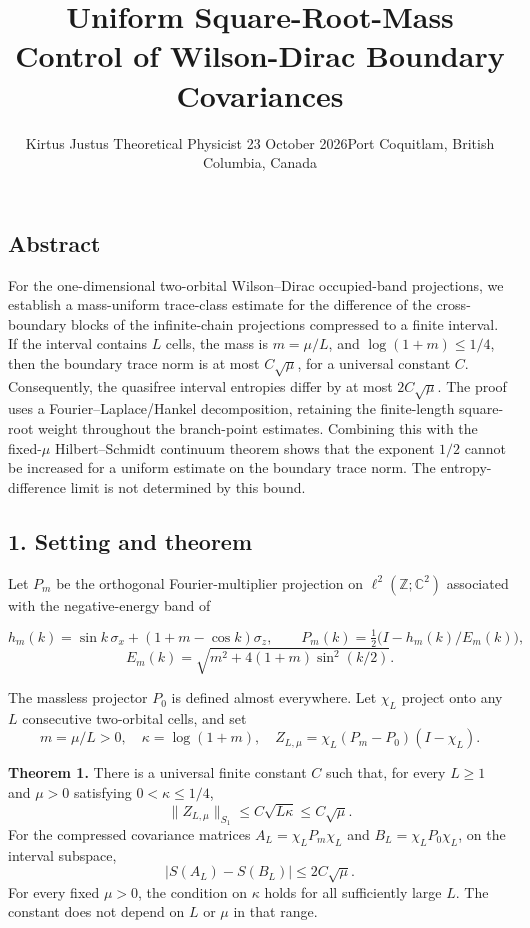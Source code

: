 \documentclass[
  10pt,
  a4paper,
]{article}
\title{Uniform Square-Root-Mass Control of Wilson-Dirac Boundary Covariances}
\author{Kirtus Justus \textbullet{} Theoretical Physicist \textbullet{} 23 October 2026\tabularnewline Port Coquitlam, British Columbia, Canada}
\date{}
\begin{document}
\maketitle

\subsection{Abstract}\label{abstract}

For the one-dimensional two-orbital Wilson--Dirac occupied-band projections, we establish a mass-uniform trace-class estimate for the difference of the cross-boundary blocks of the infinite-chain projections compressed to a finite interval. If the interval contains \(L\) cells, the mass is \(m=\mu/L\), and \(\log(1+m)\le 1/4\), then the boundary trace norm is at most \(C\sqrt{\mu}\), for a universal constant \(C\). Consequently, the quasifree interval entropies differ by at most \(2C\sqrt\mu\). The proof uses a Fourier--Laplace/Hankel decomposition, retaining the finite-length square-root weight throughout the branch-point estimates. Combining this with the fixed-\(\mu\) Hilbert--Schmidt continuum theorem shows that the exponent \(1/2\) cannot be increased for a uniform estimate on the boundary trace norm. The entropy-difference limit is not determined by this bound.

\subsection{1. Setting and theorem}\label{setting-and-theorem}

Let \(P_m\) be the orthogonal Fourier-multiplier projection on \(\ell^2(\mathbb Z;\mathbb C^2)\) associated with the negative-energy band of

\[
 h_m(k)=\sin k\,\sigma_x+(1+m-\cos k)\sigma_z,
 \qquad P_m(k)=\tfrac12\bigl(I-h_m(k)/E_m(k)\bigr),
\] \[
 E_m(k)=\sqrt{m^2+4(1+m)\sin^2(k/2)}.
\]

The massless projector \(P_0\) is defined almost everywhere. Let \(\chi_L\) project onto any \(L\) consecutive two-orbital cells, and set \[
 m=\mu/L>0,\quad \kappa=\log(1+m),\quad
 Z_{L,\mu}=\chi_L(P_m-P_0)(I-\chi_L).
\]

\textbf{Theorem 1.} There is a universal finite constant \(C\) such that, for every \(L\ge1\) and \(\mu>0\) satisfying \(0<\kappa\le1/4\), \[
 \boxed{\|Z_{L,\mu}\|_{S_1}\le C\sqrt{L\kappa}\le C\sqrt\mu.}\tag{1}
\] For the compressed covariance matrices \(A_L=\chi_LP_m\chi_L\) and \(B_L=\chi_LP_0\chi_L\), on the interval subspace, \[
 \boxed{|S(A_L)-S(B_L)|\le 2C\sqrt\mu.}\tag{2}
\] For every fixed \(\mu>0\), the condition on \(\kappa\) holds for all sufficiently large \(L\). The constant does not depend on \(L\) or \(\mu\) in that range.
\end{document}
